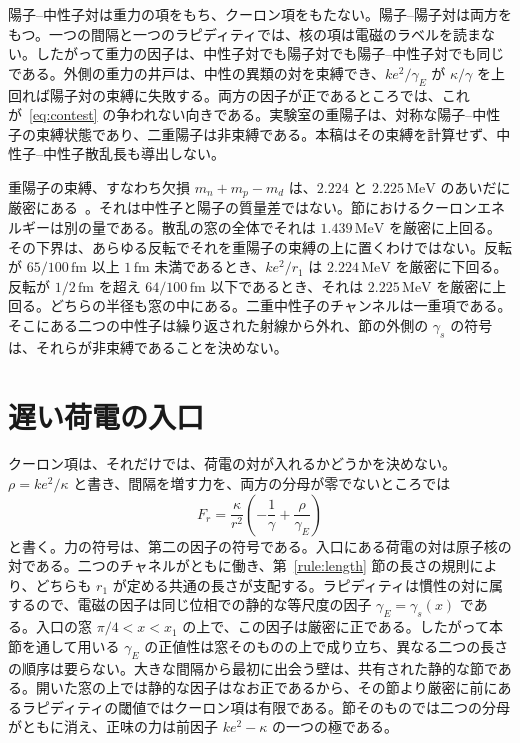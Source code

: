 \documentclass[a4paper]{article}
\begin{document}
陽子--中性子対は重力の項をもち、クーロン項をもたない。陽子--陽子対は両方をもつ。一つの間隔と一つのラピディティでは、核の項は電磁のラベルを読まない。したがって重力の因子は、中性子対でも陽子対でも陽子--中性子対でも同じである。外側の重力の井戸は、中性の異類の対を束縛でき、\(k e^{2}/\gamma_E\) が \(\kappa/\gamma\) を上回れば陽子対の束縛に失敗する。両方の因子が正であるところでは、これが~\eqref{eq:contest} の争われない向きである。実験室の重陽子は、対称な陽子--中性子の束縛状態であり、二重陽子は非束縛である。本稿はその束縛を計算せず、中性子--中性子散乱長も導出しない。

重陽子の束縛、すなわち欠損 \(m_n+m_p-m_d\) は、\(2.224\) と \(2.225\,\mathrm{MeV}\) のあいだに厳密にある~\cite{codata2018}。それは中性子と陽子の質量差ではない。節におけるクーロンエネルギーは別の量である。散乱の窓の全体でそれは \(1.439\,\mathrm{MeV}\) を厳密に上回る。その下界は、あらゆる反転でそれを重陽子の束縛の上に置くわけではない。反転が \(65/100\,\mathrm{fm}\) 以上 \(1\,\mathrm{fm}\) 未満であるとき、\(ke^{2}/r_1\) は \(2.224\,\mathrm{MeV}\) を厳密に下回る。反転が \(1/2\,\mathrm{fm}\) を超え \(64/100\,\mathrm{fm}\) 以下であるとき、それは \(2.225\,\mathrm{MeV}\) を厳密に上回る。どちらの半径も窓の中にある。二重中性子のチャンネルは一重項である。そこにある二つの中性子は繰り返された射線から外れ、節の外側の \(\gamma_s\) の符号は、それらが非束縛であることを決めない。

\section{遅い荷電の入口}
\label{sec:cold}

クーロン項は、それだけでは、荷電の対が入れるかどうかを決めない。\(\rho=k e^{2}/\kappa\) と書き、間隔を増す力を、両方の分母が零でないところでは
\begin{equation}
\label{eq:charged-net}
F_r
  =\frac{\kappa}{r^{2}}
  \left(-\frac{1}{\gamma}+\frac{\rho}{\gamma_E}\right)
\end{equation}
と書く。力の符号は、第二の因子の符号である。入口にある荷電の対は原子核の対である。二つのチャネルがともに働き、第~\ref{rule:length} 節の長さの規則により、どちらも \(r_1\) が定める共通の長さが支配する。ラピディティは慣性の対に属するので、電磁の因子は同じ位相での静的な等尺度の因子 \(\gamma_E=\gamma_s(x)\) である。入口の窓 \(\pi/4<x<x_1\) の上で、この因子は厳密に正である。したがって本節を通して用いる \(\gamma_E\) の正値性は窓そのものの上で成り立ち、異なる二つの長さの順序は要らない。大きな間隔から最初に出会う壁は、共有された静的な節である。開いた窓の上では静的な因子はなお正であるから、その節より厳密に前にあるラピディティの閾値ではクーロン項は有限である。節そのものでは二つの分母がともに消え、正味の力は前因子 \(ke^{2}-\kappa\) の一つの極である。
\end{document}
